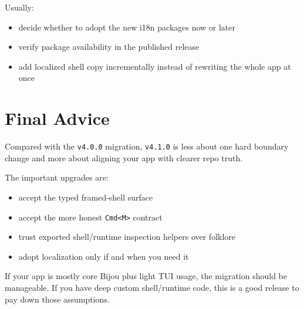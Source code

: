 Usually:

\begin{itemize}
\tightlist
\item
  decide whether to adopt the new i18n packages now or later
\item
  verify package availability in the published release
\item
  add localized shell copy incrementally instead of rewriting the whole app at once
\end{itemize}

\section{Final Advice}\label{record-264-final-advice}

Compared with the \texttt{v\allowbreak{}4\allowbreak{}.\allowbreak{}0\allowbreak{}.\allowbreak{}0} migration, \texttt{v\allowbreak{}4\allowbreak{}.\allowbreak{}1\allowbreak{}.\allowbreak{}0} is less about one hard boundary change and more about aligning your app with clearer repo truth.

The important upgrades are:

\begin{itemize}
\tightlist
\item
  accept the typed framed-shell surface
\item
  accept the more honest \texttt{C\allowbreak{}m\allowbreak{}d\allowbreak{}<\allowbreak{}M\allowbreak{}>} contract
\item
  trust exported shell/runtime inspection helpers over folklore
\item
  adopt localization only if and when you need it
\end{itemize}

If your app is mostly core Bijou plus light TUI usage, the migration should be manageable. If you have deep custom shell/runtime code, this is a good release to pay down those assumptions.

